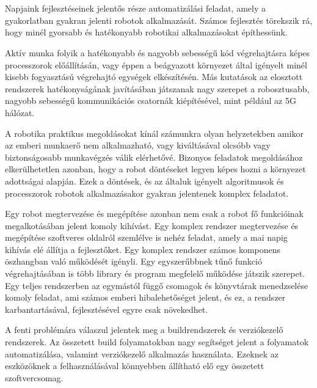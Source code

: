 \chapter{\bevezetes}

Napjaink fejlesztéseinek jelentős része automatizálási feladat, amely a
gyakorlatban gyakran jelenti robotok alkalmazását. Számos fejlesztés törekszik
rá, hogy minél gyorsabb és hatékonyabb robotikai alkalmazásokat építhessünk.

Aktív munka folyik a hatékonyabb és nagyobb sebességű kód végrehajtásra képes
processzorok előállításán, vagy éppen a beágyazott környezet által igényelt
minél kisebb fogyasztású végrehajtó egységek elkészítésén. Más kutatások az
elosztott rendszerek hatékonyságának javításában játszanak nagy szerepet a
robosztusabb, nagyobb sebességű kommunikációs csatornák kiépítésével, mint
például az 5G hálózat.

\medskip

A robotika praktikus megoldásokat kínál számunkra olyan helyzetekben amikor az
emberi munkaerő nem alkalmazható, vagy kiváltásával olcsóbb vagy biztonságosabb
munkavégzés válik elérhetővé. Bizonyos feladatok megoldásához elkerülhetetlen
azonban, hogy a robot döntéseket legyen képes hozni a környezet adottságai
alapján. Ezek a döntések, és az általuk igényelt algoritmusok és processzorok
robotok alkalmazásakor gyakran jelentenek komplex feladatot.

Egy robot megtervezése és megépítése azonban nem csak a robot fő funkcióinak
megalkotásában jelent komoly kihívást. Egy komplex rendszer megtervezése és
megépítése szoftveres oldalról szemlélve is nehéz feladat, amely a mai napig
kihívás elé állítja a fejlesztőket. Egy komplex rendszer számos komponens
öszhangban való működését igényli. Egy egyszerűbbnek tűnő funkció végrehajtásában
is több library és program megfelelő működése játszik szerepet. Egy teljes
rendszerben az egymástól függő csomagok és könyvtárak menedzselése komoly
feladat, ami számos emberi hibalehetőséget jelent, és ez, a rendszer
karbantartásával, fejlesztésével egyre csak növekedhet.

\medskip

A fenti problémára válaszul jelentek meg a buildrendszerek és verziókezelő
rendszerek. Az összetett build folyamatokban nagy segítséget jelent a folyamatok
automatizálása, valamint verziókezelő alkalmazás használata. Ezeknek az
eszközöknek a felhasználásával könnyebben állítható elő egy összetett
szoftvercsomag.

